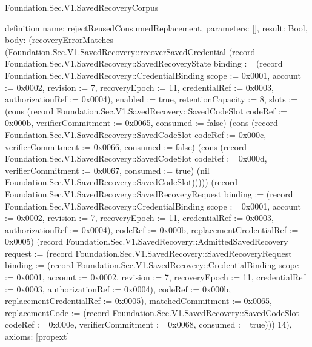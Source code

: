 \begin{lexlean}{Foundation.Sec.V1.SavedRecoveryCorpus}
\begin{semanticmodule}
definition{
  name: rejectReusedConsumedReplacement,
  parameters: [],
  result: Bool,
  body: (recoveryErrorMatches (Foundation.Sec.V1.SavedRecovery::recoverSavedCredential (record Foundation.Sec.V1.SavedRecovery::SavedRecoveryState {binding := (record Foundation.Sec.V1.SavedRecovery::CredentialBinding {scope := 0x0001, account := 0x0002, revision := 7, recoveryEpoch := 11, credentialRef := 0x0003, authorizationRef := 0x0004}), enabled := true, retentionCapacity := 8, slots := (cons (record Foundation.Sec.V1.SavedRecovery::SavedCodeSlot {codeRef := 0x000b, verifierCommitment := 0x0065, consumed := false}) (cons (record Foundation.Sec.V1.SavedRecovery::SavedCodeSlot {codeRef := 0x000c, verifierCommitment := 0x0066, consumed := false}) (cons (record Foundation.Sec.V1.SavedRecovery::SavedCodeSlot {codeRef := 0x000d, verifierCommitment := 0x0067, consumed := true}) (nil Foundation.Sec.V1.SavedRecovery::SavedCodeSlot))))}) (record Foundation.Sec.V1.SavedRecovery::SavedRecoveryRequest {binding := (record Foundation.Sec.V1.SavedRecovery::CredentialBinding {scope := 0x0001, account := 0x0002, revision := 7, recoveryEpoch := 11, credentialRef := 0x0003, authorizationRef := 0x0004}), codeRef := 0x000b, replacementCredentialRef := 0x0005}) (record Foundation.Sec.V1.SavedRecovery::AdmittedSavedRecovery {request := (record Foundation.Sec.V1.SavedRecovery::SavedRecoveryRequest {binding := (record Foundation.Sec.V1.SavedRecovery::CredentialBinding {scope := 0x0001, account := 0x0002, revision := 7, recoveryEpoch := 11, credentialRef := 0x0003, authorizationRef := 0x0004}), codeRef := 0x000b, replacementCredentialRef := 0x0005}), matchedCommitment := 0x0065, replacementCode := (record Foundation.Sec.V1.SavedRecovery::SavedCodeSlot {codeRef := 0x000e, verifierCommitment := 0x0068, consumed := true})})) 14),
  axioms: [propext]
}


\end{semanticmodule}
\end{lexlean}
